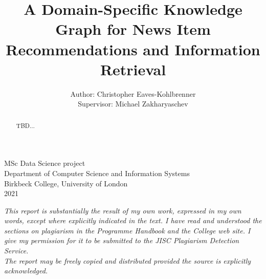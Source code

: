 \documentclass[11pt]{article}
\title{A Domain-Specific Knowledge Graph for News Item Recommendations and Information Retrieval}
\author{Author: Christopher Eaves-Kohlbrenner \\ Supervisor: Michael Zakharyaschev}
\begin{document}
\maketitle

\begin{center}
\hfill \break
\hfill \break
\hfill \break
MSc Data Science project\\
Department of Computer Science and Information Systems\\
Birkbeck College, University of London\\
2021\\
\hfill \break
\hfill \break
\hfill \break

\textit{This report is substantially the result of my own work, expressed in my own words, except where explicitly indicated in the text. I have read and understood the sections on plagiarism in the Programme Handbook and the College web site. I give my permission for it to be submitted to the JISC Plagiarism Detection Service. \\
\hfill \break
The report may be freely copied and distributed provided the source is explicitly acknowledged.}
\end{center}


\newpage
\begin{abstract}
TBD...
\end{abstract}

\newpage
\tableofcontents

\end{document}
